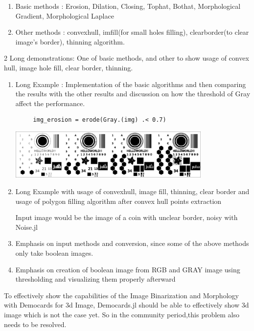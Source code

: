 \begin{enumerate}
  \item  Basic methods : Erosion, Dilation, Closing, Tophat, Bothat, Morphological Gradient, Morphological Laplace 
  \item  Other methods : convexhull, imfill(for small holes filling), clearborder(to clear image's border), thinning algorithm.
\end{enumerate}
 2 Long demonstrations: One of basic methods, and other to show usage of convex hull, image hole fill, clear border, thinning.
 \begin{enumerate}
     \item Long Example : Implementation of the basic algorithms and then comparing the results with the other results and discussion on how the threshold of Gray affect the performance.
     \begin{verbatim}
     img_erosion = erode(Gray.(img) .< 0.7)
     \end{verbatim}
     \begin{displayquote}
        \includegraphics[width=10cm,scale=0.5]{assets/morphology.png}
     \end{displayquote}
     \item Long Example with usage of convexhull, image fill, thinning, clear border and usage of polygon filling algorithm after convex hull points extraction
     \begin{displayquote}
        Input image would be the image of a coin with unclear border, noisy with Noise.jl
     \end{displayquote}
    \item Emphasis on input methods and conversion, since some of the above methods only take boolean images.
    \item Emphasis on creation of boolean image from RGB and GRAY image using thresholding and visualizing them properly afterward
 \end{enumerate}

To effectively show the capabilities of the Image Binarization and Morphology with Democards for 3d Image, Democards.jl should be able to effectively show 3d image which is not the case yet. So in the community period,this problem also needs to be resolved.

